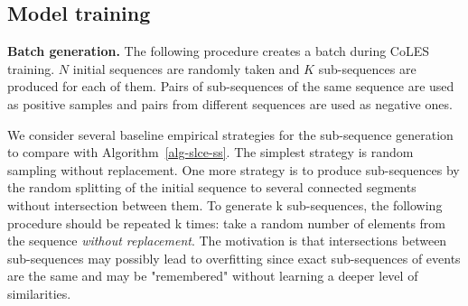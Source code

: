 \documentclass[sigconf, anonymous]{acmart}
\begin{document}
\subsection{Model training} \label{sec-training}

\textbf{Batch generation.} The following procedure creates a batch during CoLES training. $N$ initial sequences are randomly taken and $K$ sub-sequences are produced for each of them. Pairs of sub-sequences of the same sequence are used as positive samples and pairs from different sequences are used as negative ones.

We consider several baseline empirical strategies for the sub-sequence generation to compare with Algorithm~\ref{alg-slce-ss}. The simplest strategy is random sampling without replacement.
One more strategy is to produce sub-sequences by the random splitting of the initial sequence to several connected segments without intersection between them.
To generate k sub-sequences, the following procedure should be repeated k times: take a random number of elements from the sequence \textit{without replacement}. The motivation is that intersections between sub-sequences may possibly lead to overfitting since exact sub-sequences of events are the same and may be "remembered" without learning a deeper level of similarities.
\end{document}
